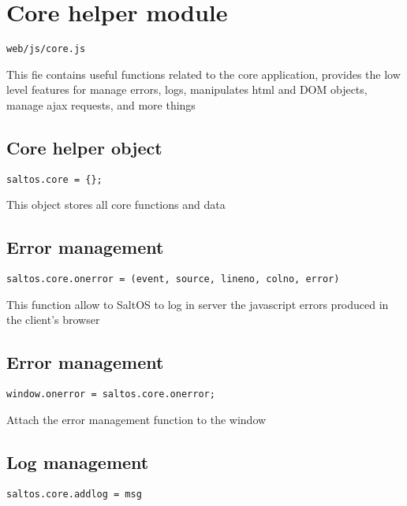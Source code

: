 \documentclass[a4paper]{book}
\begin{document}
\hypertarget{toc478}{}
\section{Core helper module}

\begin{lstlisting}
web/js/core.js
\end{lstlisting}

This fie contains useful functions related to the core application, provides the low level features
for manage errors, logs, manipulates html and DOM objects, manage ajax requests, and more things

\hypertarget{toc479}{}
\subsection{Core helper object}

\begin{lstlisting}
saltos.core = {};
\end{lstlisting}

This object stores all core functions and data

\hypertarget{toc480}{}
\subsection{Error management}

\begin{lstlisting}
saltos.core.onerror = (event, source, lineno, colno, error)
\end{lstlisting}

This function allow to SaltOS to log in server the javascript errors produced in the client's browser

\hypertarget{toc481}{}
\subsection{Error management}

\begin{lstlisting}
window.onerror = saltos.core.onerror;
\end{lstlisting}

Attach the error management function to the window

\hypertarget{toc482}{}
\subsection{Log management}

\begin{lstlisting}
saltos.core.addlog = msg
\end{lstlisting}
\end{document}
